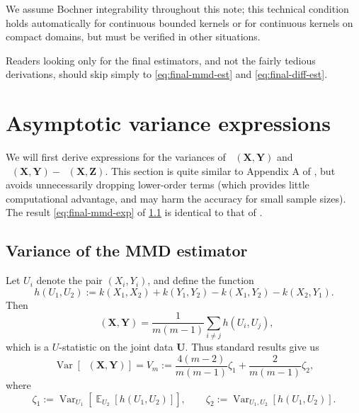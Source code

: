 \documentclass{article}
\DeclareMathOperator{\E}{\mathbb{E}}
\DeclareMathOperator{\Var}{Var}
\DeclareMathOperator{\mmdsqu}{\widehat{MMD}_U^2}
\newcommand{\setX}{\mathbf{X}}
\newcommand{\setY}{\mathbf{Y}}
\newcommand{\setZ}{\mathbf{Z}}
\newcommand{\setU}{\mathbf{U}}
\begin{document}
We assume Bochner integrability throughout this note;
this technical condition holds automatically for continuous bounded kernels
or for continuous kernels on compact domains,
but must be verified in other situations.

Readers looking only for the final estimators, and not the fairly tedious derivations,
should skip simply to \eqref{eq:final-mmd-est} and \eqref{eq:final-diff-est}. 


\section{Asymptotic variance expressions} \label{sec:var-expressions}

We will first derive expressions for the variances of
$\mmdsqu(\setX, \setY)$
and $\mmdsqu(\setX, \setY) - \mmdsqu(\setX, \setZ)$.
This section is quite similar to Appendix A of \textcite{three-sample},
but avoids unnecessarily dropping lower-order terms
(which provides little computational advantage, and may harm the accuracy for small sample sizes).
The result \eqref{eq:final-mmd-exp} of \cref{sec:mmd-expression} is identical to that of \textcite{opt-mmd}.


\subsection{Variance of the MMD estimator} \label{sec:mmd-expression}

Let $U_i$ denote the pair $(X_i, Y_i)$,
and define the function
\[
    h(U_1, U_2) := k(X_1, X_2) + k(Y_1, Y_2) - k(X_1, Y_2) - k(X_2, Y_1)
.\]
Then \[
\mmdsqu(\setX, \setY) = \frac{1}{m (m-1)} \sum_{i \ne j} h(U_i, U_j)
,\]
which is a $U$-statistic on the joint data $\setU$.
Thus standard results \parencite[Section 5.2.1, Lemma A]{serfling}
give us
\[
    \Var\left[ \mmdsqu(\setX, \setY) \right]
    = V_m
    := \frac{4 (m-2)}{m (m-1)} \zeta_1 + \frac{2}{m (m-1)} \zeta_2
,\] where
\[
    \zeta_1 := \Var_{U_1}\left[ \E_{U_2}\left[ h(U_1, U_2) \right] \right],
    \qquad
    \zeta_2 := \Var_{U_1, U_2}\left[ h(U_1, U_2) \right]
.\]
\end{document}
